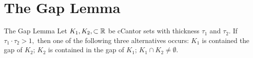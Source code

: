 \section{The Gap Lemma}
\begin{lemma}{The Gap Lemma}\cite{palis&takens}
    Let $K_1, K_2, \subset \mathbb{R}$ be cCantor sets with thickness $\tau_1$ and  $\tau_2$.  If $\tau_1 \cdot \tau_2 >1,$ then one of the following three alternatives occurs: $K_1$ is contained the gap of $K_2$; $K_2$ is contained in the gap of $K_1$; $K_1 \cap K_2 \neq \emptyset.$
\end{lemma}